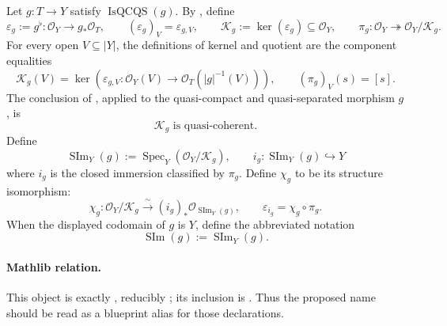 \begin{definition}
  \label{def:nagata-scheme-theoretic-image}
  \lean{}

  Let \(g\colon T\to Y\) satisfy
  \(\operatorname{IsQCQS}(g)\).  By
  , define
  \[
    \varepsilon_g:=g^\flat\colon\mathcal O_Y\longrightarrow g_*\mathcal O_T,
    \qquad
    (\varepsilon_g)_V=\varepsilon_{g,V},
    \qquad
    \mathcal K_g:=\ker(\varepsilon_g)\subseteq\mathcal O_Y,
    \qquad
    \pi_g\colon\mathcal O_Y\twoheadrightarrow
      \mathcal O_Y/\mathcal K_g.
  \]
  For every open $V\subseteq|Y|$, the definitions of kernel and quotient are
  the component equalities
  \[
    \mathcal K_g(V)
      =\ker\!\left(
        \varepsilon_{g,V}\colon\mathcal O_Y(V)\to
        \mathcal O_T(|g|^{-1}(V))
      \right),
    \qquad
    (\pi_g)_V(s)=[s].
  \]
  The conclusion of
  \cite[\href{https://stacks.math.columbia.edu/tag/01R5}{Tag 01R5}]
  {stacks-project}, applied to the quasi-compact and quasi-separated morphism
  $g$, is
  \[
    \mathcal K_g\text{ is quasi-coherent}.
  \]
  Define
  \[
    \operatorname{SIm}_Y(g):=
      \operatorname{Spec}_Y(\mathcal O_Y/\mathcal K_g),
    \qquad
    i_g\colon\operatorname{SIm}_Y(g)\hookrightarrow Y
  \]
  where $i_g$ is the closed immersion classified by $\pi_g$.  Define
  $\chi_g$ to be its structure isomorphism:
  \[
    \chi_g\colon\mathcal O_Y/\mathcal K_g
      \xrightarrow{\ \sim\ }(i_g)_*
      \mathcal O_{\operatorname{SIm}_Y(g)},
    \qquad
    \varepsilon_{i_g}=\chi_g\circ\pi_g.
  \]
  When the displayed codomain of $g$ is $Y$, define the abbreviated notation
  \[
    \operatorname{SIm}(g):=\operatorname{SIm}_Y(g).
  \]

  \paragraph{Mathlib relation.}
  This object is exactly
  \texttt{}, reducibly
  \texttt{}; its inclusion is
  \texttt{}.  Thus the proposed name
  \texttt{} should be read as a
  blueprint alias for those declarations.
\end{definition}

